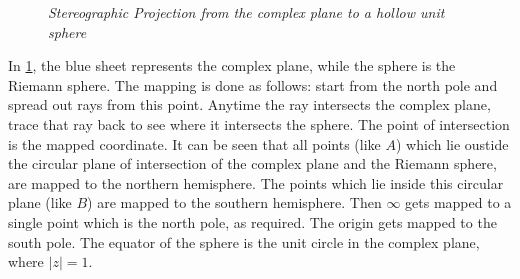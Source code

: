 \documentclass[12pt, letterpaper]{book}
\begin{document}
\begin{figure}
    \begin{center}
        \caption{\emph{Stereographic Projection from the complex plane to a hollow unit sphere}}
        \label{stereo}    
    \end{center}
\end{figure}

In \cref{stereo}, the blue sheet represents the complex plane, while the sphere is the Riemann sphere. The mapping is done as follows: start from the north pole and spread out rays from this point. Anytime the ray intersects the complex plane, trace that ray back to see where it intersects the sphere. The point of intersection is the mapped coordinate. It can be seen that all points (like $A$) which lie oustide the circular plane of intersection of the complex plane and the Riemann sphere, are mapped to the northern hemisphere. The points which lie inside this circular plane (like $B$) are mapped to the southern hemisphere. Then $\infty$ gets mapped to a single point which is the north pole, as required. The origin gets mapped to the south pole. The equator of the sphere is the unit circle in the complex plane, where $|z|= 1$.
\end{document}
